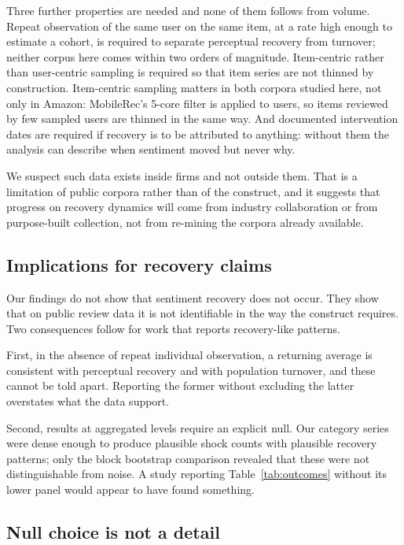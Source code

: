 \documentclass[11pt,a4paper]{article}
\makeatletter
\let\original@subsection\subsection
\renewcommand{\subsection}{\FloatBarrier\original@subsection}%
\makeatother
\begin{document}
Three further properties are needed and none of them follows from volume.
Repeat observation of the same user on the same item, at a rate high enough to
estimate a cohort, is required to separate perceptual recovery from turnover;
neither corpus here comes within two orders of magnitude. Item-centric rather
than user-centric sampling is required so that item series are not thinned by
construction. Item-centric sampling matters in both corpora studied here, not only in
Amazon: MobileRec's 5-core filter is applied to users, so items reviewed by
few sampled users are thinned in the same way. And documented intervention
dates are required if recovery is to be attributed to anything: without them the analysis can describe when
sentiment moved but never why.

We suspect such data exists inside firms and not outside them. That is a
limitation of public corpora rather than of the construct, and it suggests that
progress on recovery dynamics will come from industry collaboration or from
purpose-built collection, not from re-mining the corpora already available.

\subsection{Implications for recovery claims}

Our findings do not show that sentiment recovery does not occur. They show
that on public review data it is not identifiable in the way the construct
requires. Two consequences follow for work that reports recovery-like
patterns.

First, in the absence of repeat individual observation, a returning average is
consistent with perceptual recovery and with population turnover, and these
cannot be told apart. Reporting the former without excluding the latter
overstates what the data support.

Second, results at aggregated levels require an explicit null. Our category
series were dense enough to produce plausible shock counts with plausible
recovery patterns; only the block bootstrap comparison revealed that these
were not distinguishable from noise. A study reporting
Table~\ref{tab:outcomes} without its lower panel would appear to have found
something.

\subsection{Null choice is not a detail}
\label{sec:nullchoice}
\end{document}
